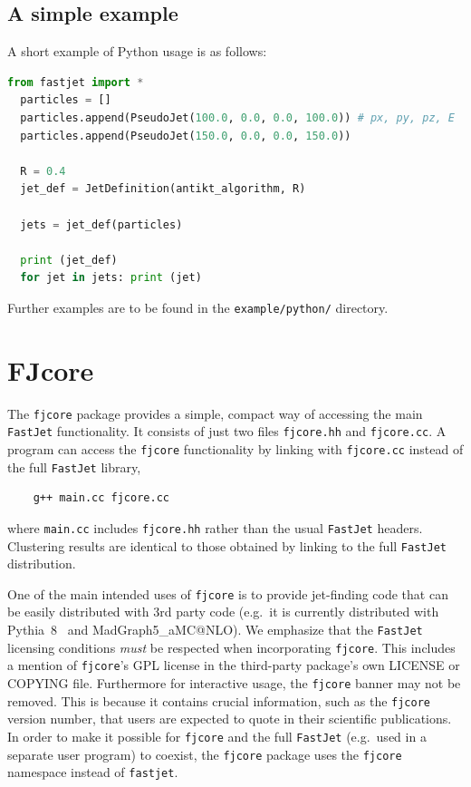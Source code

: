 \documentclass[12pt,a4]{article}
\newcommand{\fastjet}{\texttt{FastJet}\xspace}
\newcommand{\fjcore}{\texttt{fjcore}\xspace}
\newcommand{\ttt}[1]{{\small\texttt{#1}}}
\begin{document}
\subsection{A simple example}
\label{sec:python-example}

A short example of Python usage is as follows:
%
\begin{lstlisting}[language=Python]
  from fastjet import *
  particles = []
  particles.append(PseudoJet(100.0, 0.0, 0.0, 100.0)) # px, py, pz, E
  particles.append(PseudoJet(150.0, 0.0, 0.0, 150.0))

  R = 0.4
  jet_def = JetDefinition(antikt_algorithm, R)

  jets = jet_def(particles)

  print (jet_def)
  for jet in jets: print (jet)
\end{lstlisting}
Further examples are to be found in the \ttt{example/python/}
directory.

\section{FJcore}
\label{sec:fjcore}

The \ttt{fjcore} package provides a simple, compact way of accessing
the main \fastjet functionality.
%
It consists of just two files \ttt{fjcore.hh} and \ttt{fjcore.cc}.
%
A program can access the \ttt{fjcore} functionality by linking with
\ttt{fjcore.cc} instead of the full \fastjet library,
\begin{lstlisting}
    g++ main.cc fjcore.cc
\end{lstlisting}
where \ttt{main.cc} includes \ttt{fjcore.hh} rather than the usual
\fastjet headers.
%
Clustering results are identical to those obtained by linking to the
full \fastjet distribution.

One of the main intended uses of \fjcore is to provide jet-finding
code that can be easily distributed with 3rd party code (e.g.\ it is
currently distributed with Pythia~8~\cite{Sjostrand:2007gs} and
MadGraph5\_aMC@NLO).
%
We emphasize that the \fastjet licensing conditions \emph{must} be
respected when incorporating \fjcore.
%
This includes a mention of \fjcore's GPL license in the third-party
package's own LICENSE or COPYING file.
%
Furthermore for interactive usage, the \fjcore banner may not be
removed.
%
This is because it contains crucial information, such as the \fjcore version
number, that users are expected to quote in their scientific
publications.
%
In order to make it possible for \ttt{fjcore} and the full \fastjet
(e.g.\ used in a separate user program) to coexist, the \fjcore
package uses the \ttt{fjcore} namespace instead of \ttt{fastjet}.
\end{document}
